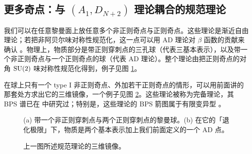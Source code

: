 \subsection{更多奇点：与 $(A_1,D_{N+2})$ 理论耦合的规范理论}
\label{sec:4.5}

我们可以在任意黎曼面上放任意多个非正则奇点与正则奇点。这些理论是渐近自由理论；若把非阿贝尔味对称性规范化，这一点可以用 AD 理论对 $\beta$ 函数的贡献来确认 \cite{22}。物理上，物质部分是带正则穿刺点的三孔球（代表三基本表示），以及带一个非正则奇点与一个正则奇点的球（代表 AD 理论）。整个理论由把正则奇点的对角 $\operatorname{SU}(2)$ 味对称性规范化得到，例子见图 \ref{fig:6}。

在球上只有一个 type I 非正则奇点、外加若干正则奇点的情形，可以用前面讲的那套处方求出它的三维镜像，一个例子见图 \ref{fig:7}。这些理论被称为完备理论，其 BPS 谱已在 \cite{31} 中研究过；特别是，这些理论的 BPS 箭图属于有限变异型 \cite{43}。

\begin{figure}[tbp]
\centering

\caption{(a) 带一个非正则穿刺点与两个正则穿刺点的黎曼球。(b) 在它的「退化极限」下，物质是两个基本表示加上我们前面定义的一个 AD 点。}
\label{fig:6}
\end{figure}

\begin{figure}[tbp]
\centering

\caption{上一图所述规范理论的三维镜像。}
\label{fig:7}
\end{figure}
